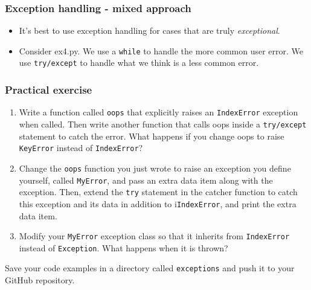\documentclass[10pt]{beamer}
\begin{document}
\begin{frame}
	\frametitle{Exception handling - mixed approach}
	\begin{itemize}
		\item It's best to use exception handling for 
			cases that are truly \emph{exceptional}.
		\item Consider ex4.py. We use a \texttt{while} to 
			handle the more common user error.  We use
			\texttt{try/except} to handle what we think is a less
			common error.

	\end{itemize}
\end{frame}

\begin{frame}
	\frametitle{Practical exercise}
	\begin{enumerate}
		\item Write a function called \texttt{oops} that 
			explicitly raises an \texttt{IndexError}
			exception when called. Then write another 
			function that calls oops inside a \texttt{try/except}
			statement to catch the error. What happens if you 
			change oops to raise \texttt{KeyError} instead of 
			\texttt{IndexError}?

		\item Change the \texttt{oops} function you just wrote to 
			raise an exception you define yourself, 
			called \texttt{MyError}, and pass an extra data item along 
			with the exception. Then, extend the \texttt{try} 
			statement in the catcher function to catch 
			this exception and its data in addition to 
			i\texttt{IndexError}, and print the extra data item.
		\item Modify your \texttt{MyError} exception class so that it
			inherits from \texttt{IndexError} instead of
			\texttt{Exception}.  What happens when it is thrown?
	\end{enumerate}

	Save your code examples in a directory called \texttt{exceptions} and
	push it to your GitHub repository.
\end{frame}
\end{document}
